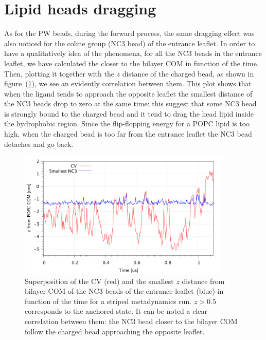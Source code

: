 
\section{Lipid heads dragging}
As for the \ac{PW} beads, during the forward process, the same dragging effect was also noticed for the coline group (NC$3$ bead) of the entrance leaflet. In order to have a qualitatively idea of the phenomena, for all the NC$3$ beads in the entrance leaflet, we have calculated the closer to the bilayer \ac{COM} in function of the time. Then, plotting it together with the $z$ distance of the charged bead, as shown in figure~(\ref{fig:NC3Correlation}), we see an evidently correlation between them. This plot shows that when the ligand tends to approach the opposite leaflet the smallest distance of the NC$3$ beads drop to zero at the same time: this suggest that some NC$3$ bead is strongly bound to the charged bead and it tend to drag the head lipid inside the hydrophobic region. Since the flip-flopping energy for a \ac{POPC} lipid is too high, when the charged bead is too far from the entrance leaflet the NC$3$ bead detaches and go back. 
\begin{figure}[ht]
	\center
	\includegraphics[width=0.9\textwidth]{./img/results/NC3Correlation}
	\caption{Superposition of the \acs{CV} (red) and the smallest $z$ distance from bilayer \acs{COM} of the NC$3$ beads of the entrance leaflet (blue) in function of the time for a striped metadynamics run. $z>0.5$ corresponds to the anchored state. It can be noted a clear correlation between them: the NC$3$ bead closer to the bilayer \acs{COM} follow the charged bead approaching the opposite leaflet.}
	\label{fig:NC3Correlation}
\end{figure}

